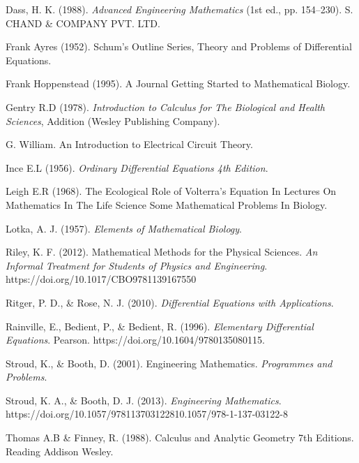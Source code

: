 \documentclass[11pt]{report}
\begin{document}
	\begin{description}
		\item Dass, H. K. (1988). \emph{Advanced Engineering Mathematics} (1st ed., pp. 154–230). S. CHAND \& COMPANY PVT. LTD.
		
		\item Frank Ayres (1952). Schum's Outline Series, Theory and Problems of Differential Equations.
		
		\item Frank Hoppenstead (1995). A Journal Getting Started to Mathematical Biology.
		
		\item Gentry R.D (1978). \emph{Introduction to Calculus for The Biological and Health Sciences}, Addition (Wesley Publishing Company).
		
		\item G. William. An Introduction to Electrical Circuit Theory.
		
		\item Ince E.L (1956). \emph{Ordinary Differential Equations 4th Edition}.
		
		\item Leigh E.R (1968). The Ecological Role of Volterra’s Equation In Lectures On Mathematics In The Life Science Some Mathematical Problems In Biology.
		
		\item Lotka, A. J. (1957). \emph{Elements of Mathematical Biology}.
		
		\item Riley, K. F. (2012). Mathematical Methods for the Physical Sciences. \emph{An Informal Treatment for Students of Physics and Engineering}. https://doi.org/10.1017/CBO9781139167550
		
		\item Ritger, P. D., \& Rose, N. J. (2010). \emph{Differential Equations with Applications}.
		
		\item Rainville, E., Bedient, P., \& Bedient, R. (1996). \emph{Elementary Differential Equations}. Pearson. https://doi.org/10.1604/9780135080115.
		
		\item Stroud, K., \& Booth, D. (2001). Engineering Mathematics. \emph{Programmes and Problems}.
		
		\item Stroud, K. A., \& Booth, D. J. (2013). \emph{Engineering Mathematics}. https://doi.org/10.1057/978113703122810.1057/978-1-137-03122-8
		
		\item Thomas A.B \& Finney, R. (1988). Calculus and Analytic Geometry 7th Editions. Reading Addison Wesley.
		
		

		
	\end{description}
	
\end{document}
